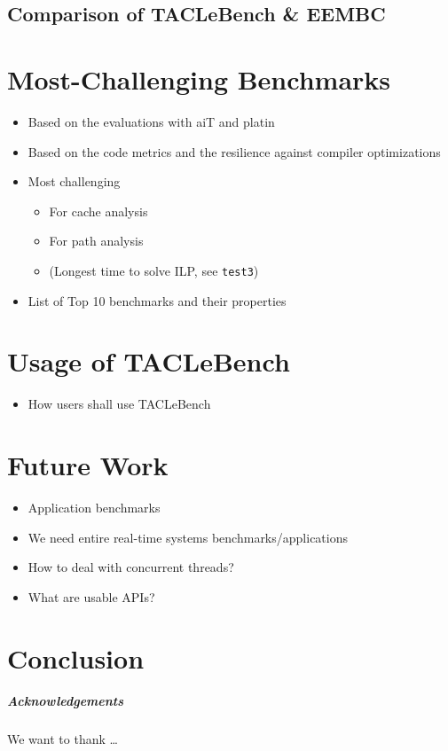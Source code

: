 \documentclass[a4paper,USenglish]{lites}
\begin{document}
\subsection{Comparison of TACLeBench \& EEMBC}
\label{subsec:eembc-comparison}


\section{Most-Challenging Benchmarks}
\begin{itemize}
  \item Based on the evaluations with aiT and platin
  \item Based on the code metrics and the resilience against compiler optimizations
  \item Most challenging
  \begin{itemize}
    \item For cache analysis
    \item For path analysis
    \item (Longest time to solve ILP, see \lstinline|test3|)
  \end{itemize}
  \item List of Top 10 benchmarks and their properties
\end{itemize}

\section{Usage of TACLeBench}
\begin{itemize}
  \item How users shall use TACLeBench
\end{itemize}

\section{Future Work}

\begin{itemize}
  \item Application benchmarks
  \item We need entire real-time systems benchmarks/applications
  \item How to deal with concurrent threads?
  \item What are usable APIs?
\end{itemize}

\section{Conclusion}

\subparagraph*{Acknowledgements}

We want to thank \dots



\end{document}

